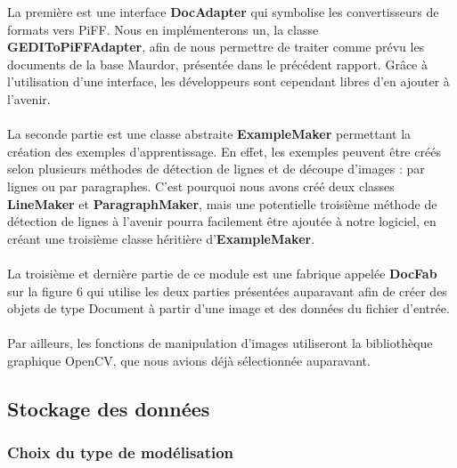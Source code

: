 \newpage

La première est  une interface \textbf{DocAdapter} qui symbolise les
convertisseurs de formats vers PiFF. Nous en implémenterons un, la classe
\textbf{GEDIToPiFFAdapter}, afin de nous permettre de traiter comme prévu les
documents de la base Maurdor, présentée dans le précédent rapport. Grâce à
l’utilisation d’une interface, les développeurs sont cependant libres d’en
ajouter à l’avenir.

\paragraph{}

La seconde partie est une classe abstraite \textbf{ExampleMaker} permettant
la création des exemples d’apprentissage. En effet, les exemples peuvent être
créés selon plusieurs méthodes de détection de lignes et de découpe d’images :
par lignes ou par paragraphes. C’est pourquoi nous avons créé deux classes
\textbf{LineMaker} et \textbf{ParagraphMaker}, mais une potentielle troisième
méthode de détection de lignes à l’avenir pourra facilement être ajoutée à
notre logiciel, en créant une troisième classe héritière
d’\textbf{ExampleMaker}.

\paragraph{}

La troisième et dernière partie de ce module est une fabrique appelée
\textbf{DocFab} sur la figure 6 qui utilise les deux parties présentées
auparavant afin de créer des objets de type Document à partir d’une image et
des données du fichier d’entrée.

\paragraph{}

Par ailleurs, les fonctions de manipulation d’images utiliseront la bibliothèque graphique OpenCV, que nous avions déjà sélectionnée auparavant.

\subsection{Stockage des données}

\subsubsection{Choix du type de modélisation}

